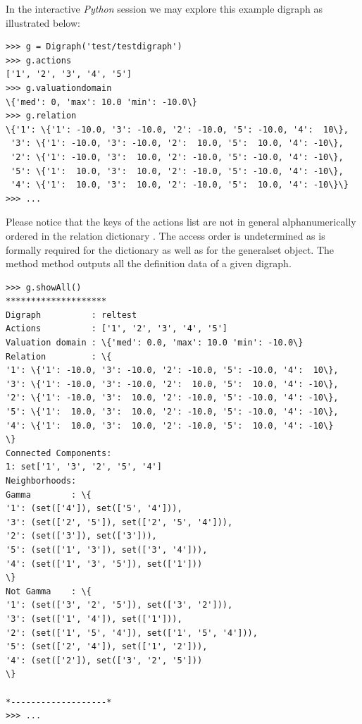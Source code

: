 \documentclass{article}
\newcommand{\+}{\verb+}
\renewcommand{\*}{\back{}}
\newcommand{\Py}{\emph{Python}\xspace }
\begin{document}
\begin{center}
In the interactive \Py session we may explore this example digraph as illustrated below:
\begin{example}
\begin{verbatim}
>>> g = Digraph('test/testdigraph')
>>> g.actions
['1', '2', '3', '4', '5']
>>> g.valuationdomain
\{'med': 0, 'max': 10.0 'min': -10.0\}
>>> g.relation
\{'1': \{'1': -10.0, '3': -10.0, '2': -10.0, '5': -10.0, '4':  10\}, 
 '3': \{'1': -10.0, '3': -10.0, '2':  10.0, '5':  10.0, '4': -10\}, 
 '2': \{'1': -10.0, '3':  10.0, '2': -10.0, '5': -10.0, '4': -10\}, 
 '5': \{'1':  10.0, '3':  10.0, '2': -10.0, '5': -10.0, '4': -10\}, 
 '4': \{'1':  10.0, '3':  10.0, '2': -10.0, '5':  10.0, '4': -10\}\}
>>> ...
\end{verbatim}
\end{example}
Please notice that the keys of the actions list are not in general alphanumerically ordered in the relation dictionary . The access order is undetermined as is formally required for the dictionary as well as for the generalset object. The  method method outputs all the definition data of a given digraph. 
\begin{example}
\begin{verbatim}
>>> g.showAll()
********************
Digraph          : reltest
Actions          : ['1', '2', '3', '4', '5']
Valuation domain : \{'med': 0.0, 'max': 10.0 'min': -10.0\}
Relation         : \{
'1': \{'1': -10.0, '3': -10.0, '2': -10.0, '5': -10.0, '4':  10\}, 
'3': \{'1': -10.0, '3': -10.0, '2':  10.0, '5':  10.0, '4': -10\}, 
'2': \{'1': -10.0, '3':  10.0, '2': -10.0, '5': -10.0, '4': -10\}, 
'5': \{'1':  10.0, '3':  10.0, '2': -10.0, '5': -10.0, '4': -10\}, 
'4': \{'1':  10.0, '3':  10.0, '2': -10.0, '5':  10.0, '4': -10\}
\}
Connected Components:
1: set['1', '3', '2', '5', '4']
Neighborhoods:
Gamma        : \{
'1': (set(['4']), set(['5', '4'])), 
'3': (set(['2', '5']), set(['2', '5', '4'])), 
'2': (set(['3']), set(['3'])), 
'5': (set(['1', '3']), set(['3', '4'])), 
'4': (set(['1', '3', '5']), set(['1']))
\}
Not Gamma    : \{
'1': (set(['3', '2', '5']), set(['3', '2'])), 
'3': (set(['1', '4']), set(['1'])), 
'2': (set(['1', '5', '4']), set(['1', '5', '4'])), 
'5': (set(['2', '4']), set(['1', '2'])), 
'4': (set(['2']), set(['3', '2', '5']))
\}

*-------------------*
>>> ...

\end{verbatim}
\end{example}


\end{center}
\end{document}
